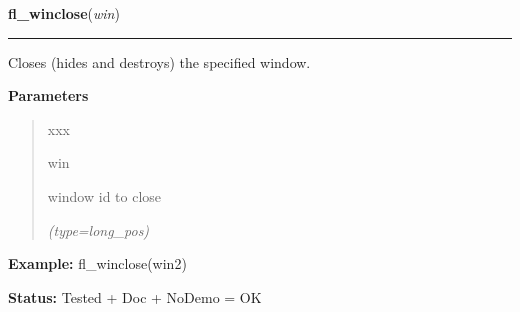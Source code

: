 \hspace{.8\funcindent}\begin{boxedminipage}{\funcwidth}

    \raggedright \textbf{fl\_winclose}(\textit{win})

    \vspace{-1.5ex}

    \rule{\textwidth}{0.5\fboxrule}
\setlength{\parskip}{2ex}
    Closes (hides and destroys) the specified window.

\setlength{\parskip}{1ex}
      \textbf{Parameters}
      \vspace{-1ex}

      \begin{quote}
        \begin{Ventry}{xxx}

          \item[win]

          window id to close

            {\it (type=long\_pos)}

        \end{Ventry}

      \end{quote}

\textbf{Example:} fl\_winclose(win2)



\textbf{Status:} Tested + Doc + NoDemo = OK



    \end{boxedminipage}

    \label{xformslib:flxbasic:fl_winset}

    \vspace{0.5ex}

